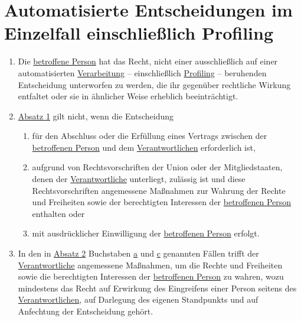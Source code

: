 \chapter{Automatisierte Entscheidungen im Einzelfall einschließlich Profiling}
\label{ch:22}


\begin{enumerate}

  \item Die \hyperref[itm:04-1]{betroffene Person} hat das Recht, nicht einer ausschließlich auf einer automatisierten \hyperref[itm:04-2]{Verarbeitung} --
   einschließlich \hyperref[itm:04-4]{Profiling} -- beruhenden Entscheidung unterworfen zu werden, die ihr gegenüber rechtliche Wirkung
   entfaltet oder sie in ähnlicher Weise erheblich beeinträchtigt.
  \label{itm:22-1}

  \item \hyperref[itm:22-1]{Absatz 1} gilt nicht, wenn die Entscheidung
  \label{itm:22-2}

  \begin{enumerate}
  
    \item für den Abschluss oder die Erfüllung eines Vertrags zwischen der \hyperref[itm:04-1]{betroffenen Person} und dem \hyperref[itm:04-7]{Verantwortlichen}
     erforderlich ist,
    \label{itm:22-2a}

    \item aufgrund von Rechtsvorschriften der Union oder der Mitgliedstaaten, denen der \hyperref[itm:04-7]{Verantwortliche} unterliegt,
     zulässig ist und diese Rechtsvorschriften angemessene Maßnahmen zur Wahrung der Rechte und Freiheiten sowie der
     berechtigten Interessen der \hyperref[itm:04-1]{betroffenen Person} enthalten oder
    \label{itm:22-2b}

    \item mit ausdrücklicher Einwilligung der \hyperref[itm:04-1]{betroffenen Person} erfolgt.
    \label{itm:22-2c}

  \end{enumerate}

  \item In den in \hyperref[itm:22-2]{Absatz 2} Buchstaben \hyperref[itm:22-2a]{a} und \hyperref[itm:22-2c]{c} genannten
   Fällen trifft der \hyperref[itm:04-7]{Verantwortliche} angemessene Maßnahmen, um die Rechte und Freiheiten sowie die berechtigten
   Interessen der \hyperref[itm:04-1]{betroffenen Person} zu wahren, wozu mindestens das Recht auf Erwirkung des Eingreifens einer Person
   seitens des \hyperref[itm:04-7]{Verantwortlichen}, auf Darlegung des eigenen Standpunkts und auf Anfechtung der Entscheidung gehört.
  \label{itm:22-3}


\end{enumerate}
